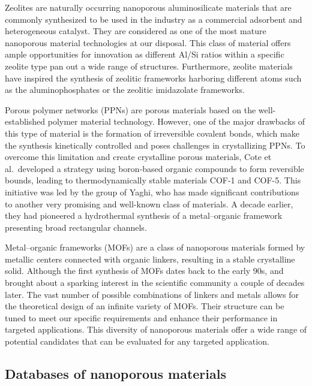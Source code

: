 \documentclass[main.tex]{subfiles}
\begin{document}
Zeolites are naturally occurring nanoporous aluminosilicate materials that are commonly synthesized to be used in the industry as a commercial adsorbent and heterogeneous catalyst.\autocite{Ozin_1989,Ma_2000} They are considered as one of the most mature nanoporous material technologies at our disposal. This class of material offers ample opportunities for innovation as different Al/Si ratios within a specific zeolite type pan out a wide range of structures. Furthermore, zeolite materials have inspired the synthesis of zeolitic frameworks harboring different atoms such as the aluminophosphates or the zeolitic imidazolate frameworks.\autocite{Wang_2012,Chen_2014_zeo} 

Porous polymer networks (PPNs) are porous materials based on the well-established polymer material technology.\autocite{Lu_2010,Wang_2020,Che_2020} However, one of the major drawbacks of this type of material is the formation of irreversible covalent bonds, which make the synthesis kinetically controlled and poses challenges in crystallizing PPNs.\autocite{Feng_2012} To overcome this limitation and create crystalline porous materials, Cote et al.\ developed a strategy using boron-based organic compounds to form reversible bounds, leading to thermodynamically stable materials COF-1 and COF-5.\autocite{Cote_2005} This initiative was led by the group of Yaghi, who has made significant contributions to another very promising and well-known class of materials. A decade earlier, they had pioneered a hydrothermal synthesis of a metal--organic framework presenting broad rectangular channels.\autocite{Yaghi_1995} 

Metal--organic frameworks (MOFs) are a class of nanoporous materials formed by metallic centers connected with organic linkers, resulting in a stable crystalline solid. Although the first synthesis of MOFs dates back to the early 90s,\autocite{Abrahams_1991} and brought about a sparking interest in the scientific community a couple of decades later.\autocite{Kuppler_2009,Furukawa_2013} The vast number of possible combinations of linkers and metals allows for the theoretical design of an infinite variety of MOFs. Their structure can be tuned to meet our specific requirements and enhance their performance in targeted applications.\autocite{Ejsmont_2021} This diversity of nanoporous materials offer a wide range of potential candidates that can be evaluated for any targeted application. 


\subsection{Databases of nanoporous materials}
\end{document}
